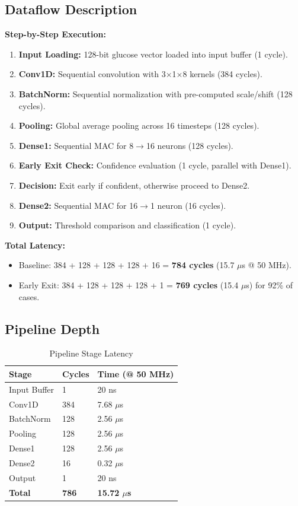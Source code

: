 \documentclass[11pt, a4paper]{article}
\begin{document}
\subsection{Dataflow Description}

\textbf{Step-by-Step Execution:}
\begin{enumerate}
    \item \textbf{Input Loading:} 128-bit glucose vector loaded into input buffer (1 cycle).
    \item \textbf{Conv1D:} Sequential convolution with 3$\times$1$\times$8 kernels (384 cycles).
    \item \textbf{BatchNorm:} Sequential normalization with pre-computed scale/shift (128 cycles).
    \item \textbf{Pooling:} Global average pooling across 16 timesteps (128 cycles).
    \item \textbf{Dense1:} Sequential MAC for 8$\to$16 neurons (128 cycles).
    \item \textbf{Early Exit Check:} Confidence evaluation (1 cycle, parallel with Dense1).
    \item \textbf{Decision:} Exit early if confident, otherwise proceed to Dense2.
    \item \textbf{Dense2:} Sequential MAC for 16$\to$1 neuron (16 cycles).
    \item \textbf{Output:} Threshold comparison and classification (1 cycle).
\end{enumerate}

\textbf{Total Latency:}
\begin{itemize}
    \item Baseline: 384 + 128 + 128 + 128 + 16 = \textbf{784 cycles} (15.7 $\mu$s @ 50 MHz).
    \item Early Exit: 384 + 128 + 128 + 128 + 1 = \textbf{769 cycles} (15.4 $\mu$s) for 92\% of cases.
\end{itemize}

\subsection{Pipeline Depth}

\begin{table}[H]
\centering
\caption{Pipeline Stage Latency}
\label{tab:pipeline}
\begin{tabular}{@{}lll@{}}
\toprule
\textbf{Stage} & \textbf{Cycles} & \textbf{Time (@ 50 MHz)} \\ \midrule
Input Buffer & 1 & 20 ns \\
Conv1D & 384 & 7.68 $\mu$s \\
BatchNorm & 128 & 2.56 $\mu$s \\
Pooling & 128 & 2.56 $\mu$s \\
Dense1 & 128 & 2.56 $\mu$s \\
Dense2 & 16 & 0.32 $\mu$s \\
Output & 1 & 20 ns \\ \midrule
\textbf{Total} & \textbf{786} & \textbf{15.72 $\mu$s} \\ \bottomrule
\end{tabular}
\end{table}
\end{document}

